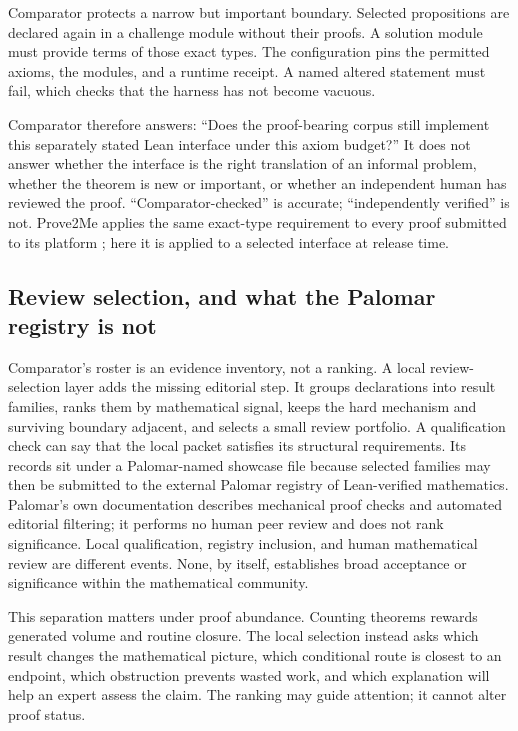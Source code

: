 \documentclass[10pt]{article}
\begin{document}
Comparator protects a narrow but important boundary. Selected propositions are
declared again in a challenge module without their proofs. A solution module
must provide terms of those exact types. The configuration pins the permitted
axioms, the modules, and a runtime receipt. A named altered statement must fail,
which checks that the harness has not become vacuous.

Comparator therefore answers: ``Does the proof-bearing corpus still implement
this separately stated Lean interface under this axiom budget?'' It does not
answer whether the interface is the right translation of an informal problem,
whether the theorem is new or important, or whether an independent human has
reviewed the proof. ``Comparator-checked'' is accurate; ``independently
verified'' is not. Prove2Me applies the same exact-type requirement to every
proof submitted to its platform \cite{prove2me}; here it is applied to a
selected interface at release time.

\subsection{Review selection, and what the Palomar registry is not}

Comparator's roster is an evidence inventory, not a ranking. A local
review-selection layer adds the missing editorial step. It groups declarations
into result families, ranks them by mathematical signal, keeps the hard
mechanism and surviving boundary adjacent, and selects a small review
portfolio. A qualification check can say that the local packet satisfies its
structural requirements. Its records sit under a Palomar-named showcase file
because selected families may then be submitted to the external Palomar
registry of Lean-verified mathematics. Palomar's own documentation describes
mechanical proof checks and automated editorial filtering; it performs no human
peer review and does not rank significance. Local qualification, registry
inclusion, and human mathematical review are different events. None, by
itself, establishes broad acceptance or significance within the mathematical
community.

This separation matters under proof abundance. Counting theorems rewards
generated volume and routine closure. The local selection instead asks which result changes
the mathematical picture, which conditional route is closest to an endpoint,
which obstruction prevents wasted work, and which explanation will help an
expert assess the claim. The ranking may guide attention; it cannot alter proof
status.
\end{document}
